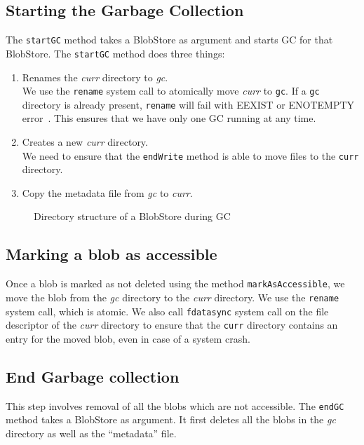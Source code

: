\subsection{Starting the Garbage Collection} \label{startgc}
The \texttt{startGC} method takes a BlobStore as argument and starts GC for that BlobStore.
The \texttt{startGC} method does three things:
  \begin{enumerate}
      \item Renames the \textit{curr} directory to \textit{gc}. \\
        We use the \texttt{rename} system call to atomically move \textit{curr} to \texttt{gc}. If a \texttt{gc} directory is already present, \texttt{rename} will fail with EEXIST or ENOTEMPTY error~\cite{renamemanpage}. This ensures that we have only one GC running at any time.
      \item Creates a new \textit{curr} directory. \\
        We need to ensure that the \texttt{endWrite} method is able to move files to the \texttt{curr} directory.
      \item Copy the metadata file from \textit{gc} to \textit{curr}. \\
  \end{enumerate}

\begin{figure}[hbt]
  \caption{Directory structure of a BlobStore during GC}
  \label{fig:blobstore-dirstructure-gc}
\end{figure}

\subsection{Marking a blob as accessible}
Once a blob is marked as not deleted using the method \texttt{markAsAccessible}, we move the blob from the \textit{gc} directory to the \textit{curr} directory.
We use the \texttt{rename} system call, which is atomic.
We also call \texttt{fdatasync} system call on the file descriptor of the \textit{curr} directory to ensure that the \texttt{curr} directory contains an entry for the moved blob, even in case of a system crash.

\subsection{End Garbage collection}
This step involves removal of all the blobs which are not accessible. The \texttt{endGC} method takes a BlobStore as argument. It first deletes all the blobs in the \textit{gc} directory as well as the ``metadata'' file.

